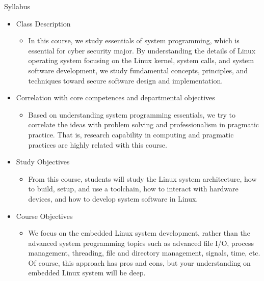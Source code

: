 \begin{frame}{Syllabus}
  \begin{itemize}
  \item Class Description
    \begin{itemize}
      \item In this course, we study essentials of system programming, which is essential for cyber security major. By understanding the details of Linux operating system focusing on the Linux kernel, system calls, and system software development, we study fundamental concepts, principles, and techniques toward secure software design and implementation.
    \end{itemize}
  \item Correlation with core competences and departmental objectives
    \begin{itemize}
      \item Based on understanding system programming essentials, we try to correlate the ideas with problem solving and professionalism in pragmatic practice. That is, research capability in computing and pragmatic practices are highly related with this course.
    \end{itemize} 
  \item Study Objectives
    \begin{itemize}
      \item From this course, students will study the Linux system architecture, how to build, setup, and use a toolchain, how to interact with hardware devices, and how to develop system software in Linux.
    \end{itemize}
  \item Course Objectives
    \begin{itemize}
      \item We focus on the embedded Linux system development, rather than the advanced system programming topics such as advanced file I/O, process management, threading, file and directory management, signals, time, etc. Of course, this approach has pros and cons, but your understanding on embedded Linux system will be deep.
    \end{itemize}  
  \end{itemize}
\end{frame}

